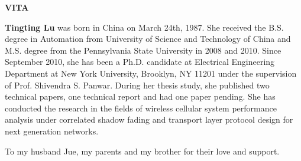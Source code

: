 \newpage
\begin{center}
 {\large\bf VITA}\vspace{0.3in} \\
 
 
\end{center}

\doublespacing

\vspace{-1mm}
\textbf{Tingting Lu} was born in China on March 24th, 1987. She received the B.S. degree in Automation from University of Science and Technology of China and M.S. degree from the Pennsylvania State University in 2008 and 2010. Since September 2010, she has been a Ph.D. candidate at Electrical Engineering Department at New York University, Brooklyn, NY 11201 under the supervision of Prof. Shivendra S. Panwar. During her thesis study, she published two technical papers, one technical report and had one paper pending. She has conducted the research in the fields of wireless cellular system performance analysis under correlated shadow fading and transport layer protocol design for next generation networks.

\newpage
 
 
 \vspace*{2in}

 
{\large \sl
\hspace{1in} 

To my husband Jue, my parents and my brother for their love and support.   

}


